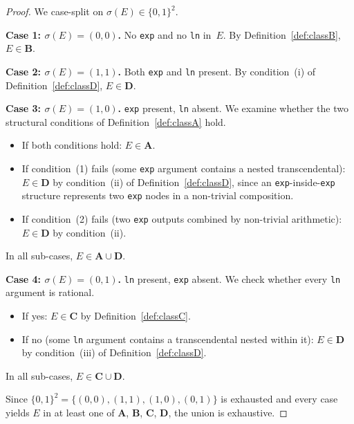 \documentclass[12pt,a4paper]{article}
\theoremstyle{definition}
\begin{document}
\begin{proof}
We case-split on $\sigma(E) \in \{0,1\}^2$.

\medskip
\noindent\textbf{Case 1: $\sigma(E) = (0,0)$.}
No \texttt{exp} and no \texttt{ln} in~$E$.
By Definition~\ref{def:classB}, $E \in \mathbf{B}$.

\medskip
\noindent\textbf{Case 2: $\sigma(E) = (1,1)$.}
Both \texttt{exp} and \texttt{ln} present.
By condition~(i) of Definition~\ref{def:classD}, $E \in \mathbf{D}$.

\medskip
\noindent\textbf{Case 3: $\sigma(E) = (1,0)$.}
\texttt{exp} present, \texttt{ln} absent.
We examine whether the two structural conditions of
Definition~\ref{def:classA} hold.
\begin{itemize}
  \item If both conditions hold: $E \in \mathbf{A}$.
  \item If condition~(1) fails (some \texttt{exp} argument contains
        a nested transcendental): $E \in \mathbf{D}$
        by condition~(ii) of Definition~\ref{def:classD}, since an
        \texttt{exp}-inside-\texttt{exp} structure represents two
        \texttt{exp} nodes in a non-trivial composition.
  \item If condition~(2) fails (two \texttt{exp} outputs combined by
        non-trivial arithmetic): $E \in \mathbf{D}$ by
        condition~(ii).
\end{itemize}
In all sub-cases, $E \in \mathbf{A} \cup \mathbf{D}$.

\medskip
\noindent\textbf{Case 4: $\sigma(E) = (0,1)$.}
\texttt{ln} present, \texttt{exp} absent.
We check whether every \texttt{ln} argument is rational.
\begin{itemize}
  \item If yes: $E \in \mathbf{C}$ by Definition~\ref{def:classC}.
  \item If no (some \texttt{ln} argument contains a transcendental
        nested within it): $E \in \mathbf{D}$ by condition~(iii)
        of Definition~\ref{def:classD}.
\end{itemize}
In all sub-cases, $E \in \mathbf{C} \cup \mathbf{D}$.

\medskip
\noindent Since $\{0,1\}^2 = \{(0,0),(1,1),(1,0),(0,1)\}$ is exhausted
and every case yields $E$ in at least one of $\mathbf{A}$, $\mathbf{B}$,
$\mathbf{C}$, $\mathbf{D}$, the union is exhaustive.
\end{proof}

\end{document}
